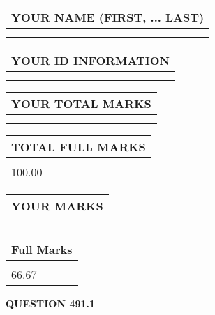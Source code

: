 \documentclass{ctexart}
\begin{document}
   
   
   
\newpage 
\setcounter{page}{ 
   491001 } 
   
   
   
   
\noindent\begin{tabular}{|l|}
\hline
YOUR NAME (FIRST, ... LAST)  \\
\hline
 \\ 
 \\ 
\hline
\end{tabular}
\hspace{0.05in} \begin{tabular}{|l|}
\hline
 YOUR   ID   INFORMATION  \\
\hline
 \\ 
 \\ 
\hline
\end{tabular}
   
   
\vspace{0.2in}\noindent\begin{tabular}{|l|}
\hline
YOUR TOTAL MARKS  \\
\hline
 \\ 
 \\ 
\hline
\end{tabular}
\hspace{0.05in} \begin{tabular}{|l|}
\hline
TOTAL FULL MARKS  \\
\hline
 \\ 
100.00 \\
\hline
\end{tabular}
   
   
 \vspace{0.2in}
 
 
 
 
   
   
  
\vspace{0.2in}
  
\noindent\begin{tabular}{|l|}
\hline
 YOUR MARKS  \\
\hline
 \\ 
 \\ 
\hline
\end{tabular}
\hspace{0.05in} \begin{tabular}{|l|}
\hline
 Full Marks  \\
\hline
 \\ 
66.67 \\
\hline
\end{tabular}
{\textbf{\Large{QUESTION
491.1 
}}}
  
\end{document}
